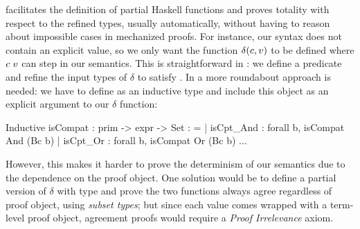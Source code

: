 \lh facilitates the definition of partial Haskell functions 
and proves totality with respect to the refined types,
usually automatically, without 
having to reason about impossible cases in mechanized proofs.
%
For instance, our syntax does not contain an explicit 
 value, so we only want the function
$\delta(c,v)$ to be defined where ${c}\;{v}$ can 
step in our semantics.
%
This is straightforward in \lh: we define a predicate 
 and refine the input
types of $\delta$ to satisfy .
%
%
In \coq a more roundabout approach is needed: we have to define 
 as an inductive type and include this object as
an explicit argument to our $\delta$ function:
%
\begin{mcode}
  Inductive isCompat : prim -> expr -> Set : =   
    | isCpt_And  : forall b, isCompat And (Bc b)
    | isCpt_Or   : forall b, isCompat Or  (Bc b) 
    ...
\end{mcode}
%
However, this makes it harder to prove the determinism of our
semantics due to the dependence on the proof object. 
%
One solution would be to define a partial version of 
$\delta$ with type
 and prove the two functions
always agree regardless of proof object, \eg using \emph{subset types};
but since  each value
comes wrapped with a term-level proof object,
agreement proofs would require a \emph{Proof Irrelevance} axiom.
%

